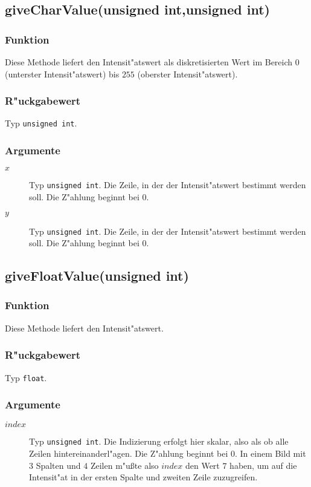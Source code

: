 \documentclass[12pt,a4paper,draft,twoside,onecolumn,titlepage]{book}
\newcommand{\carg}[1]{$ #1 $}
\newcommand{\ctyp}[1]{{\tt #1}}
\newcommand{\arglist}[1]{\footnotesize{#1}}
\begin{document}
\subsection{giveCharValue\arglist{(unsigned int,unsigned int)}}
\subsubsection{Funktion}
Diese Methode liefert den Intensit"atswert als diskretisierten Wert im Bereich $0$ (unterster Intensit"atswert) bis $255$ (oberster Intensit"atswert).
\subsubsection{R"uckgabewert}
Typ \ctyp{unsigned int}. 
\subsubsection{Argumente}
\begin{description}
\item[\carg{x}]{Typ \ctyp{unsigned int}.  Die Zeile, in der der Intensit"atswert bestimmt werden soll. Die Z"ahlung beginnt bei $0$.} 
\item[\carg{y}]{Typ \ctyp{unsigned int}.  Die Zeile, in der der Intensit"atswert bestimmt werden soll. Die Z"ahlung beginnt bei $0$.} 
\end{description}
\subsection{giveFloatValue\arglist{(unsigned int)}}
\subsubsection{Funktion}
Diese Methode liefert den Intensit"atswert.
\subsubsection{R"uckgabewert}
Typ \ctyp{float}. 
\subsubsection{Argumente}
\begin{description}
\item[\carg{index}]{Typ \ctyp{unsigned int}.  Die Indizierung erfolgt hier skalar, also als ob alle Zeilen hintereinanderl"agen. Die Z"ahlung beginnt bei $0$. In einem Bild mit $3$ Spalten und $4$ Zeilen m"u{\ss}te also \carg{index} den Wert $7$ haben, um auf die Intensit"at in der ersten Spalte und zweiten Zeile zuzugreifen.} 
\end{description}
\end{document}

